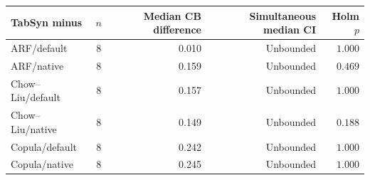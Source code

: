 \begin{tabular}{@{}lcrrr@{}}
\toprule
TabSyn minus & $n$ & Median CB difference & Simultaneous median CI & Holm $p$ \\
\midrule
ARF/default & 8 & 0.010 & Unbounded & $1.000$ \\
ARF/native & 8 & 0.159 & Unbounded & $0.469$ \\
Chow--Liu/default & 8 & 0.157 & Unbounded & $1.000$ \\
Chow--Liu/native & 8 & 0.149 & Unbounded & $0.188$ \\
Copula/default & 8 & 0.242 & Unbounded & $1.000$ \\
Copula/native & 8 & 0.245 & Unbounded & $1.000$ \\
\bottomrule
\end{tabular}
